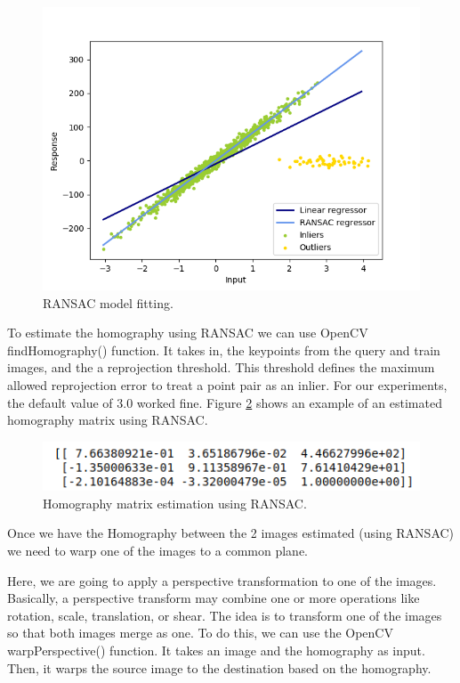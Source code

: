 \documentclass[10pt,twocolumn,letterpaper]{article}
\begin{document}
\begin{figure}[h!]
\begin{center}
	\includegraphics[width=0.80\columnwidth]{pics/ransac.png}
	\caption{RANSAC model fitting.\label{fig:ransac-fitting}}   
\end{center} 
\end{figure} 

To estimate the homography using RANSAC we can use OpenCV findHomography() function. It takes in, the keypoints from the query and train images, and the a reprojection threshold. This threshold defines the maximum allowed reprojection error to treat a point pair as an inlier. For our experiments, the default value of 3.0 worked fine. Figure \ref{fig:ransac-homography} shows an example of an estimated homography matrix using RANSAC.

\begin{figure}[h!]
\begin{center}
	\includegraphics[width=0.80\columnwidth]{pics/homography.png}
	\caption{Homography matrix estimation using RANSAC.\label{fig:ransac-homography}}   
\end{center} 
\end{figure} 

Once we have the Homography between the 2 images estimated (using RANSAC) we need to warp one of the images to a common plane.

Here, we are going to apply a perspective transformation to one of the images. Basically, a perspective transform may combine one or more operations like rotation, scale, translation, or shear. The idea is to transform one of the images so that both images merge as one. To do this, we can use the OpenCV warpPerspective() function. It takes an image and the homography as input. Then, it warps the source image to the destination based on the homography.
\end{document}
